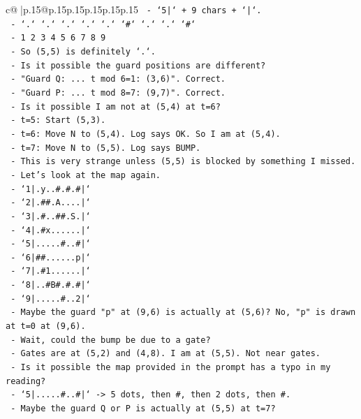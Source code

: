 \documentclass{article}
\begin{document}
{\begin{supertabular}{c@{$\;$}|p{.15\linewidth}@{}p{.15\linewidth}p{.15\linewidth}p{.15\linewidth}p{.15\linewidth}p{.15\linewidth}}
{{{\texttt{  {-} `5|` + 9 chars + `|`.} \\
\texttt{  {-} `.` `.` `.` `.` `.` `\#` `.` `.` `\#`} \\
\texttt{  {-} 1 2 3 4 5 6 7 8 9} \\
\texttt{  {-} So (5,5) is definitely `.`.} \\
\texttt{  {-} Is it possible the guard positions are different?} \\
\texttt{  {-} "Guard Q: ... t mod 6=1: (3,6)". Correct.} \\
\texttt{  {-} "Guard P: ... t mod 8=7: (9,7)". Correct.} \\
\texttt{  {-} Is it possible I am not at (5,4) at t=6?} \\
\texttt{  {-} t=5: Start (5,3).} \\
\texttt{  {-} t=6: Move N to (5,4). Log says OK. So I am at (5,4).} \\
\texttt{  {-} t=7: Move N to (5,5). Log says BUMP.} \\
\texttt{  {-} This is very strange unless (5,5) is blocked by something I missed.} \\
\texttt{  {-} Let's look at the map again.} \\
\texttt{  {-} `1|.y..\#.\#.\#|`} \\
\texttt{  {-} `2|.\#\#.A....|`} \\
\texttt{  {-} `3|.\#..\#\#.S.|`} \\
\texttt{  {-} `4|.\#x......|`} \\
\texttt{  {-} `5|.....\#..\#|`} \\
\texttt{  {-} `6|\#\#......p|`} \\
\texttt{  {-} `7|.\#1......|`} \\
\texttt{  {-} `8|..\#B\#.\#.\#|`} \\
\texttt{  {-} `9|.....\#..2|`} \\
\texttt{  {-} Maybe the guard "p" at (9,6) is actually at (5,6)? No, "p" is drawn at t=0 at (9,6).} \\
\texttt{  {-} Wait, could the bump be due to a gate?} \\
\texttt{  {-} Gates are at (5,2) and (4,8). I am at (5,5). Not near gates.} \\
\texttt{  {-} Is it possible the map provided in the prompt has a typo in my reading?} \\
\texttt{  {-} `5|.....\#..\#|` {-}> 5 dots, then \#, then 2 dots, then \#.} \\
\texttt{  {-} Maybe the guard Q or P is actually at (5,5) at t=7?} \\
}}}
\end{supertabular}}
\end{document}
